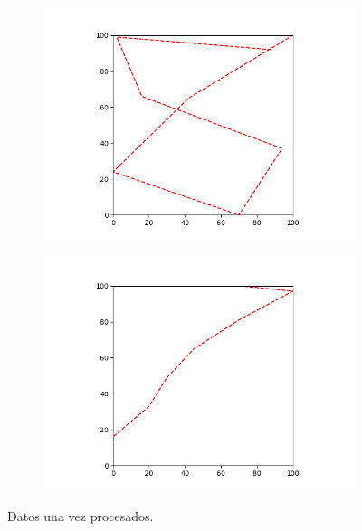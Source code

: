 \documentclass[12pt,a4paper]{article}
\begin{document}
\begin{figure}[H]
	\centering
	\begin{subfigure}[b]{0.4\textwidth}
		
		\includegraphics[width=\textwidth]{images/digito8Escalado.png}
		\caption[Digito ocho recogido por la tableta y procesado]{}
		\label{fig:digito8Escalado}
	\end{subfigure}
	\begin{subfigure}[b]{0.4\textwidth}
		
		\includegraphics[width=\textwidth]{images/digito1Escalado.png}
		\caption[Digito uno recogido por la tableta y procesado]{}
		\label{fig:digito1Escalado}
	\end{subfigure}
	\caption[Digito ocho una vez realizada la transformación]{Datos una vez procesados.}
\end{figure}
\end{document}
